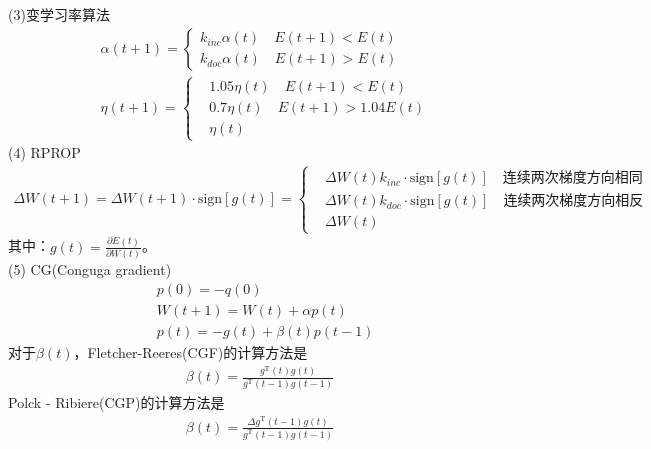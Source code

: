             (3)变学习率算法
            \begin{align*}
            &\alpha(t+1)=
            \left\{
            \begin{aligned}
            k_{inc}\alpha(t) \quad E(t+1)<E(t)\\
            k_{doc}\alpha(t) \quad E(t+1)>E(t)
            \end{aligned}
            \right.
            \\
            &\eta(t+1)=
            \left\{
            \begin{aligned}
            &1.05\eta(t) \quad E(t+1)<E(t)\\
            &0.7\eta(t)\quad E(t+1)>1.04E(t)\\
            &\eta(t)
            \end{aligned}
            \right.
            \end{align*}
            (4) RPROP
            \begin{align*}
            \Delta W(t+1) = \Delta W(t+1) \cdot \mathrm{sign}[g(t)] =
            \left\{
            \begin{aligned}
            & \Delta W(t)k_{inc} \cdot \mathrm{sign}[g(t)] \quad\text{连续两次梯度方向相同}\\
            & \Delta W(t)k_{doc} \cdot \mathrm{sign}[g(t)] \quad\text{连续两次梯度方向相反}\\
            & \Delta W(t)
            \end{aligned}
            \right.
            \end{align*}
            其中：$g(t) = \frac{\partial E(t)}{\partial W(t)}$。\\
            (5) CG(Conguga gradient)
            \begin{align*}
            & p(0) = -q(0)\\
            & W(t+1) = W(t) + \alpha p(t)\\
            & p(t) = -g(t) + \beta(t)p(t-1)
            \end{align*}
            对于$\beta(t)$，Fletcher-Reeres(CGF)的计算方法是
            \begin{align*}
            \beta(t) = \frac{g^\mathrm{T}(t)g(t)}{g^\mathrm{T}(t-1)g(t-1)}
            \end{align*}
            Polck - Ribiere(CGP)的计算方法是
            \begin{align*}
            \beta(t) = \frac{\Delta g^\mathrm{T}(t-1)g(t)}{g^\mathrm{T}(t-1)g(t-1)}
            \end{align*}
